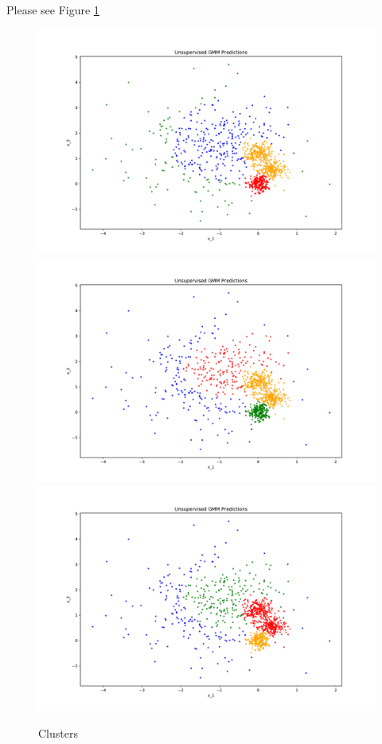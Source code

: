 \begin{answer}

    Please see Figure \ref{fig:cluster}

\begin{figure}[htbp]
    \centering 
    \includegraphics[width=0.7\linewidth]{pics/p03_pred_0.pdf}
    \includegraphics[width=0.7\linewidth]{pics/p03_pred_1.pdf}
    \includegraphics[width=0.7\linewidth]{pics/p03_pred_2.pdf}
    \caption{Clusters}
    \label{fig:cluster}
\end{figure}

\end{answer}

